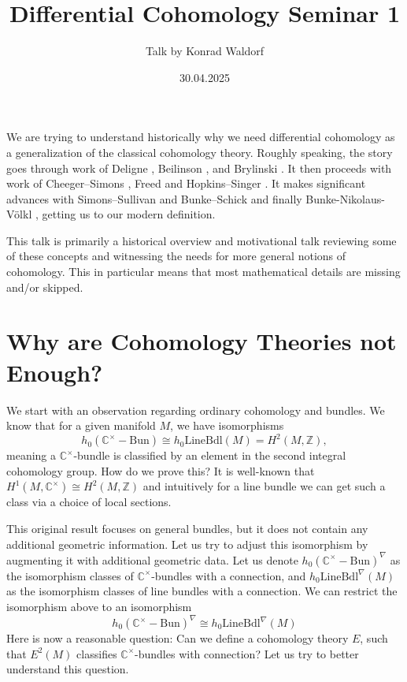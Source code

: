 \documentclass[10pt]{amsart}
\title{Differential Cohomology Seminar 1}
\date{30.04.2025}
\author{Talk by Konrad	Waldorf}
\newcommand{\bC}{\mathbb{C}}
\newcommand{\bZ}{\mathbb{Z}}
\newcommand{\Bun}{\mathrm{Bun}}
\newcommand{\LineBdl}{\mathrm{LineBdl}}
\newcommand{\nrnote}[1]{\todo[color=green!40,linecolor=green!40!black,size=\tiny]{#1}}
\begin{document}
\maketitle


We are trying to understand historically why we need differential cohomology as a generalization of the classical cohomology theory.
Roughly speaking, the story goes through work of Deligne \cite{deligne1971mixedhodge}, Beilinson \cite{beilinson1984regulators}, and Brylinski  \cite{brylinski1993geomquant}. It then proceeds with work of Cheeger--Simons \cite{cheegersimons1985diffchar}, Freed \cite{freed2000diffcoh} and Hopkins--Singer \cite{hopkinssinger2005diffcoh}. It makes significant advances with Simons--Sullivan \cite{simonssullivan2008diffcoh} and Bunke--Schick \cite{bunkeschick2009smoothk} and finally Bunke-Nikolaus-V{\"o}lkl \cite{bunkenikolausvoelkl2016diffcoh}, getting us to our modern definition. 

This talk is primarily a historical overview and motivational talk reviewing some of these concepts and witnessing the needs for more general notions of cohomology. This in particular means that most mathematical details are missing and/or skipped.

\section{Why are Cohomology Theories not Enough?}
We start with an observation regarding ordinary cohomology and bundles. We know that for a given manifold $M$, we have isomorphisms 
\[h_0(\bC^\times- \Bun) \cong h_0\LineBdl(M) = H^2(M,\bZ),\]
meaning a $\bC^\times$-bundle is classified by an element in the second integral cohomology group. How do we prove this? It is well-known that $H^1(M, \bC^\times) \cong H^2(M,\bZ)$ and intuitively for a line bundle we can get such a class via a choice of local sections. \nrnote{There should be more details here?}

This original result focuses on general bundles, but it does not contain any additional geometric information. Let us try to adjust this isomorphism by augmenting it with additional geometric data. Let us denote $h_0(\bC^\times- \Bun)^\nabla$ as the isomorphism classes of $\bC^\times$-bundles with a connection, and $h_0\LineBdl^\nabla(M)$ as the isomorphism classes of line bundles with a connection. We can restrict the isomorphism above to an isomorphism
\[h_0(\bC^\times- \Bun)^\nabla \cong h_0\LineBdl^\nabla(M) \]
Here is now a reasonable question: Can we define a cohomology theory $E$, such that $E^2(M)$ classifies $\bC^\times$-bundles with connection? Let us try to better understand this question.
\end{document}
